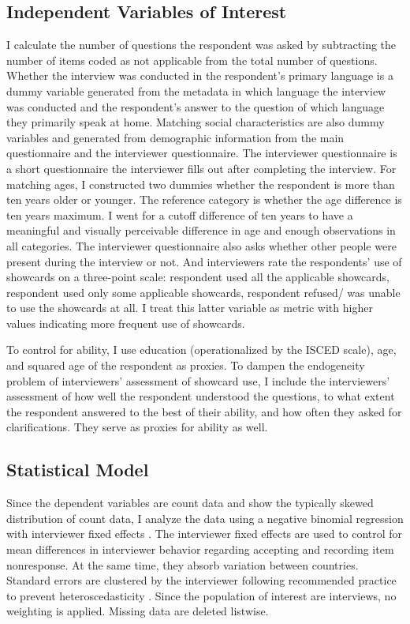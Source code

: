 \documentclass[a4paper,12pt]{article}
\begin{document}
\subsection{Independent Variables of Interest}

I calculate the number of questions the respondent was asked by subtracting the number of items coded as not applicable from the total number of questions. Whether the interview was conducted in the respondent's primary language is a dummy variable generated from the metadata in which language the interview was conducted and the respondent's answer to the question of which language they primarily speak at home. Matching social characteristics are also dummy variables and generated from demographic information from the main questionnaire and the interviewer questionnaire. The interviewer questionnaire is a short questionnaire the interviewer fills out after completing the interview. For matching ages, I constructed two dummies whether the respondent is more than ten years older or younger. The reference category is whether the age difference is ten years maximum. I went for a cutoff difference of ten years to have a meaningful and visually perceivable difference in age and enough observations in all categories. The interviewer questionnaire also asks whether other people were present during the interview or not. And interviewers rate the respondents' use of showcards on a three-point scale: respondent used all the applicable showcards, respondent used only some applicable showcards, respondent refused/ was unable to use the showcards at all. I treat this latter variable as metric with higher values indicating more frequent use of showcards.

To control for ability, I use education (operationalized by the ISCED scale), age, and squared age of the respondent as proxies. To dampen the endogeneity problem of interviewers' assessment of showcard use, I include the interviewers' assessment of how well the respondent understood the questions, to what extent the respondent answered to the best of their ability, and how often they asked for clarifications. They serve as proxies for ability as well.

\subsection{Statistical Model}

Since the dependent variables are count data and show the typically skewed distribution of count data, I analyze the data using a negative binomial regression with interviewer fixed effects \citep{allisonFixedEffectsNegativeBinomial2002}. The interviewer fixed effects are used to control for mean differences in interviewer behavior regarding accepting and recording item nonresponse. At the same time, they absorb variation between countries. Standard errors are clustered by the interviewer following recommended practice to prevent heteroscedasticity \citep[358f]{cameronRegressionAnalysisCount2013}. Since the population of interest are interviews, no weighting is applied. Missing data are deleted listwise.
\end{document}
